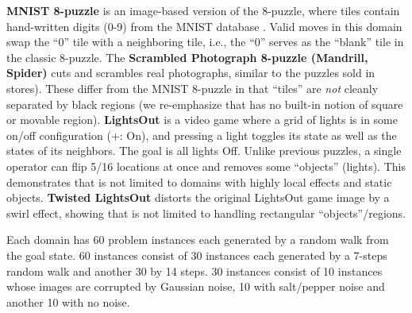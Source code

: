 \textbf{MNIST 8-puzzle}
is an image-based version of the 8-puzzle, where tiles contain hand-written digits (0-9) from the  MNIST database \cite{lecun1998gradient}.
Valid moves in this domain swap the ``0'' tile  with a neighboring tile, i.e., the ``0'' serves as the ``blank'' tile in the classic 8-puzzle. 
The \textbf{Scrambled Photograph 8-puzzle (Mandrill, Spider)} cuts and scrambles real photographs, similar to the puzzles sold in stores).
These differ from the MNIST 8-puzzle in that ``tiles'' are \textit{not} cleanly separated by black regions
(we re-emphasize that \latentplanner has no built-in notion of square or movable region).
\textbf{LightsOut} is
a video game where a grid of lights is in some on/off configuration ($+$: On),
and pressing a light toggles its state as well as the states of its neighbors.
The goal is all lights Off.
Unlike previous puzzles, a single operator can flip 5/16 locations at once and
removes some ``objects'' (lights).
This demonstrates that \latentplanner is not limited to domains with highly local effects and static objects.
\textbf{Twisted LightsOut} distorts the original LightsOut game image by a swirl effect, 
showing that \latentplanner is not limited to handling rectangular ``objects''/regions.

Each domain has 60 problem instances each generated by a random walk from
the goal state. 60 instances consist of 30 instances each generated by a 7-steps random walk
and another 30 by 14 steps. 30 instances consist of 10 instances whose images are corrupted by Gaussian noise,
10 with salt/pepper noise and another 10 with no noise.

